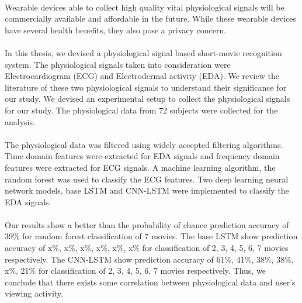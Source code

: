 \paragraph{}
Wearable devices able to collect high quality vital physiological signals will be commercially available and affordable in the future. While these wearable devices have several health benefits, they also pose a privacy concern.
\paragraph{}
In this thesis, we devised a physiological signal based short-movie recognition system. The physiological signals taken into consideration were Electrocardiogram (ECG) and Electrodermal activity (EDA). We review the literature of these two physiological signals to understand their significance for our study. We devised an experimental setup to collect the physiological signals for our study. The physiological data from 72 subjects were collected for the analysis.
\paragraph{}
The physiological data was filtered using widely accepted filtering algorithms. Time domain features were extracted for EDA signals and frequency domain features were extracted for ECG signals. A machine learning algorithm, the random forest was used to classify the ECG features. Two deep learning neural network models, base LSTM and CNN-LSTM were implemented to classify the EDA signals.
\paragraph{}
Our results show a better than the probability of chance prediction accuracy of 39\% for random forest classification of 7 movies. The base LSTM show prediction accuracy of x\%, x\%, x\%, x\%, x\%, x\% for classification of 2, 3, 4, 5, 6, 7 movies respectively. The CNN-LSTM show prediction accuracy of 61\%, 41\%, 38\%, 38\%, x\%, 21\%  for classification of 2, 3, 4, 5, 6, 7 movies respectively. Thus, we conclude that there exists some correlation between physiological data and user's viewing activity. 